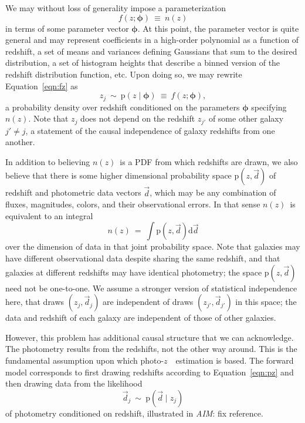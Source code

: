 \documentclass[iop]{emulateapj}
\newcommand{\todo}[3]{{\color{#2}\emph{#1}: #3}}
\newcommand{\aim}[1]{\todo{AIM}{red}{#1}}
\newcommand{\Eq}[1]{Equation~\ref{#1}}
\newcommand{\nz}{$n(z)$}
\newcommand{\data}{\ensuremath{\vec{d}}}
\newcommand{\pr}[1]{\ensuremath{\mathrm{p}(#1)}}
\newcommand{\gvn}{\mid}%
\newcommand{\integral}[2]{\ensuremath{\int #1 \mathrm{d} #2}}
\newcommand{\pz}{photo-$z$~}
\newcommand{\bvec}[1]{\ensuremath{\boldsymbol{#1}}}
\newcommand{\ndphi}{\bvec{\phi}}
\begin{document}
We may without loss of generality impose a parameterization
\begin{equation}
\label{eqn:fz}
f(z; \ndphi)\ \equiv\ n(z)
\end{equation}
in terms of some parameter vector $\ndphi$.
At this point, the parameter vector is quite general and may represent coefficients in a high-order polynomial as a function of redshift, a set of means and variances defining Gaussians that sum to the desired distribution, a set of histogram heights that describe a binned version of the redshift distribution function, etc.
Upon doing so, we may rewrite \Eq{eqn:fz} as 
\begin{equation}
\label{eqn:pz}
z_{j}\ \sim\ \pr{z \gvn \ndphi}\ \equiv\ f(z; \ndphi),
\end{equation}
a probability density over redshift conditioned on the parameters $\ndphi$ specifying \nz.
Note that $z_{j}$ does not depend on the redshift $z_{j'}$ of some other galaxy $j' \neq j$, a statement of the causal independence of galaxy redshifts from one another.

In addition to believing \nz\ is a PDF from which redshifts are drawn, we also believe that there is some higher dimensional probability space $\pr{z, \data}$ of redshift and photometric data vectors $\data$, which may be any combination of fluxes, magnitudes, colors, and their observational errors.
In that sense \nz\ is equivalent to an integral
\begin{equation}
\label{eqn:integral}
n(z)\ =\ \integral{\pr{z, \data}}{\data}
\end{equation}
over the dimension of data in that joint probability space.
Note that galaxies may have different observational data despite sharing the same redshift, and that galaxies at different redshifts may have identical photometry; the space $\pr{z, \data}$ need not be one-to-one.
We assume a stronger version of statistical independence here, that draws $(z_{j}, \data_{j})$ are independent of draws $(z_{j'}, \data_{j'})$ in this space; the data and redshift of each galaxy are independent of those of other galaxies.

However, this problem has additional causal structure that we can acknowledge.
The photometry results from the redshifts, not the other way around.
This is the fundamental assumption upon which \pz\ estimation is based.
The forward model corresponds to first drawing redshifts according to \Eq{eqn:pz} and then drawing data from the likelihood
\begin{equation}
\label{eqn:pzpdf}
\data_{j}\ \sim\ \pr{\data \gvn z_{j}}
\end{equation}
of photometry conditioned on redshift, illustrated in \aim{fix reference}.
\end{document}
